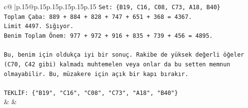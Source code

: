 \documentclass{article}
\begin{document}
{\begin{supertabular}{c@{$\;$}|p{.15\linewidth}@{}p{.15\linewidth}p{.15\linewidth}p{.15\linewidth}p{.15\linewidth}p{.15\linewidth}}
{{{\texttt{Set: \{B19, C16, C08, C73, A18, B40\}} \\
\texttt{Toplam Çaba: 889 + 884 + 828 + 747 + 651 + 368 = 4367.} \\
\texttt{Limit 4497. Sığıyor.} \\
\texttt{Benim Toplam Önem: 977 + 972 + 916 + 835 + 739 + 456 = 4895.} \\
\\ 
\texttt{Bu, benim için oldukça iyi bir sonuç. Rakibe de yüksek değerli öğeler (C70, C42 gibi) kalmadı muhtemelen veya onlar da bu setten memnun olmayabilir. Bu, müzakere için açık bir kapı bırakır.} \\
\\ 
\texttt{TEKLİF: \{"B19", "C16", "C08", "C73", "A18", "B40"\}} \\
            }
        }
    }
    & & \\ \\


\end{supertabular}}
\end{document}

